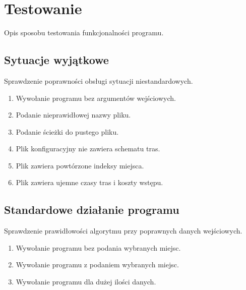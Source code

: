 \documentclass{article}
\begin{document}
\section{Testowanie}
Opis sposobu testowania funkcjonalności programu.

\subsection{Sytuacje wyjątkowe}
Sprawdzenie poprawności obsługi sytuacji niestandardowych.

\begin{enumerate}
        \item Wywołanie programu bez argumentów wejściowych.
        \item Podanie nieprawidłowej nazwy pliku.
        \item Podanie ścieżki do pustego pliku.
        \item Plik konfiguracyjny nie zawiera schematu tras.
        \item Plik zawiera powtórzone indeksy miejsca.
        \item Plik zawiera ujemne czasy tras i koszty wstępu.
\end{enumerate}

\subsection{Standardowe działanie programu}
Sprawdzenie prawidłowości algorytmu przy poprawnych danych wejściowych.
    \begin{enumerate}
        \item Wywołanie programu bez podania wybranych miejsc.
        \item Wywołanie programu z podaniem wybranych miejsc.
        \item Wywołanie programu dla dużej ilości danych.
    \end{enumerate}
\end{document}
